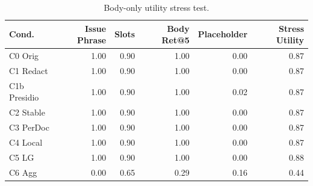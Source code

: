 \begin{table}[t]
\centering
\small
\setlength{\tabcolsep}{3pt}
\caption{Body-only utility stress test.}
\label{tab:utility_stress}
\begin{tabular}{lrrrrr}
\toprule
Cond. & Issue Phrase & Slots & Body Ret@5 & Placeholder & Stress Utility \\
\midrule
C0 Orig & 1.00 & 0.90 & 1.00 & 0.00 & 0.87 \\
C1 Redact & 1.00 & 0.90 & 1.00 & 0.00 & 0.87 \\
C1b Presidio & 1.00 & 0.90 & 1.00 & 0.02 & 0.87 \\
C2 Stable & 1.00 & 0.90 & 1.00 & 0.00 & 0.87 \\
C3 PerDoc & 1.00 & 0.90 & 1.00 & 0.00 & 0.87 \\
C4 Local & 1.00 & 0.90 & 1.00 & 0.00 & 0.87 \\
C5 LG & 1.00 & 0.90 & 1.00 & 0.00 & 0.88 \\
C6 Agg & 0.00 & 0.65 & 0.29 & 0.16 & 0.44 \\
\bottomrule
\end{tabular}
\end{table}
